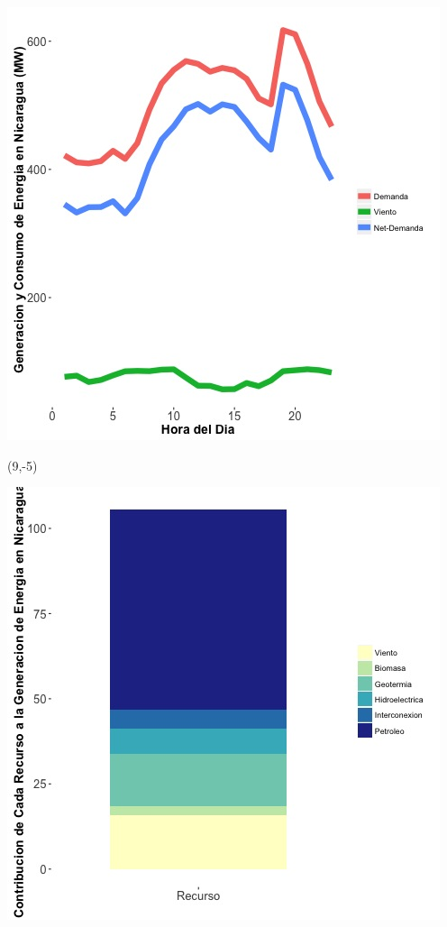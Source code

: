 \documentclass{article}\usepackage[]{graphicx}\usepackage[]{color}
\newenvironment{knitrout}{}{} %
\begin{document}
\begin{knitrout}
\color{fgcolor}
\includegraphics[scale=0.65]{figure/gridplot1.jpg} 
\end{knitrout}

 \begin{textblock}{1}(9,-5)
\begin{minipage}{20em}
\begingroup

\endgroup
\end{minipage}
\end{textblock}

 \vspace{2cm}

\begin{knitrout}
\color{fgcolor}
\includegraphics[scale=0.65]{figure/gridplot2.jpg} 
\end{knitrout}
\end{document}
